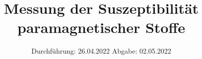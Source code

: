 

\subject{606}
\title{Messung der Suszeptibilität paramagnetischer Stoffe}
\date{%
  Durchführung: 26.04.2022
  \hspace{3em}
  Abgabe: 02.05.2022
}



\maketitle
\thispagestyle{empty}
\tableofcontents
\newpage






\printbibliography{}

%


